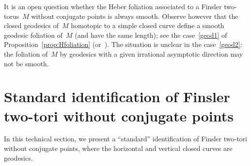 \documentclass[AHL,Unicode,longabstracts,published]{cedram}
\newcommand{\T}{\mathbb{T}}
\begin{document}
\begin{rema}
It is an open question whether the Heber foliation associated to a Finsler two-torus~$M$ without conjugate points is always smooth. Observe however that the closed geodesics of~$M$ homotopic to a simple closed curve define a smooth geodesic foliation of~$M$ (and have the same length); see the case~\eqref{geod1} of Proposition~\ref{prop:Hfoliation} (or~\cite[Section~1.2]{AABZ15}). The situation is unclear in the case~\eqref{geod2}: the foliation of~$M$ by geodesics with a given irrational asymptotic direction may not be smooth.
\end{rema}

\section{Standard identification of Finsler two-tori without conjugate points}

In this technical section, we present a ``standard'' identification of Finsler two-tori without conjugate points, where the horizontal and vertical closed curves are geodesics.
\end{document}

